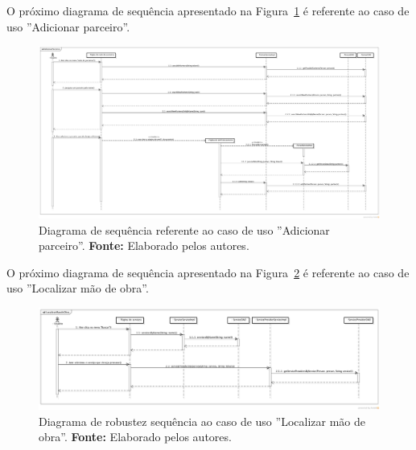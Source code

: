 O próximo diagrama de sequência apresentado na Figura~\ref{fig:ap1:diagrama_sequencia_adicionar_parceiro} é referente ao caso de uso ''Adicionar parceiro''.

\begin{landscape}
\newpage
\captionsetup[figure]{list=no}
\begin{figure}[h!]
	\centerline{\includegraphics[scale=0.3]{./imagens/apendices/diagrama-sequencia-adicionar-parceiros.png}}
	\caption[Diagrama de sequência referente ao caso de uso ''Adicionar parceiro''.]
	{Diagrama de sequência referente ao caso de uso ''Adicionar parceiro''. \textbf{Fonte:} Elaborado pelos autores.}
	\label{fig:ap1:diagrama_sequencia_adicionar_parceiro}
\end{figure}

O próximo diagrama de sequência apresentado na Figura~\ref{fig:ap1:diagrama_sequencia_localizar_mao_de_obra} é referente ao caso de uso ''Localizar mão de obra''.

\newpage
\captionsetup[figure]{list=no}
\begin{figure}[h!]
	\centerline{\includegraphics[scale=0.4]{./imagens/apendices/diagrama-sequencia-localizar-mao-de-obra.png}}
	\caption[Diagrama de sequência referente ao caso de uso ''Localizar mão de obra''.]
	{Diagrama de robustez sequência ao caso de uso ''Localizar mão de obra''. \textbf{Fonte:} Elaborado pelos autores.}
	\label{fig:ap1:diagrama_sequencia_localizar_mao_de_obra}
\end{figure}


\end{landscape}
